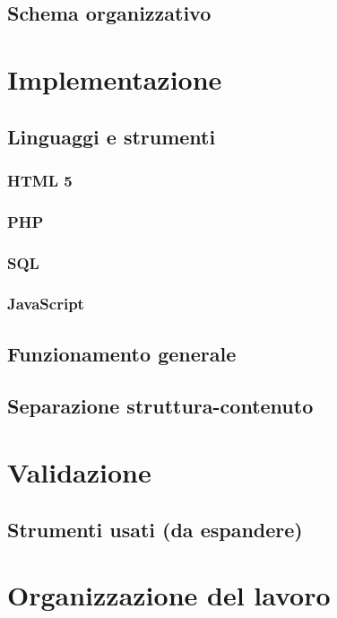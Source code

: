 \documentclass[a4paper, oneside, openany, dvipsnames, table]{article}
\begin{document}
	\subsection{Schema organizzativo}

\newpage
\section{Implementazione}
	\subsection{Linguaggi e strumenti}
		\subsubsection{HTML 5}
		\subsubsection{PHP}
		\subsubsection{SQL}
		\subsubsection{JavaScript}
	\subsection{Funzionamento generale}
	\subsection{Separazione struttura-contenuto}
	
\newpage
\section{Validazione}
	\subsection{Strumenti usati (da espandere)}
	
\newpage
\section{Organizzazione del lavoro}
\end{document}
